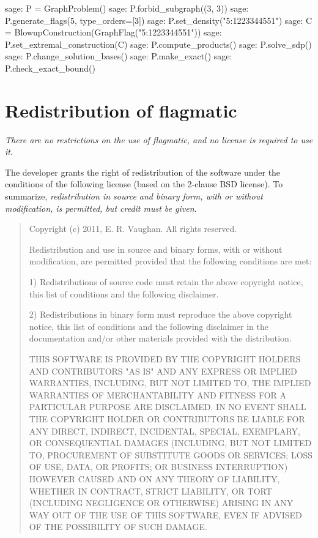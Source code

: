 \documentclass{article}
\begin{document}
\begin{sage}
sage: P = GraphProblem()
sage: P.forbid_subgraph((3, 3))
sage: P.generate_flags(5, type_orders=[3])
sage: P.set_density("5:1223344551")
sage: C = BlowupConstruction(GraphFlag("5:1223344551"))
sage: P.set_extremal_construction(C)
sage: P.compute_products()
sage: P.solve_sdp()
sage: P.change_solution_bases()
sage: P.make_exact()
sage: P.check_exact_bound()
\end{sage}

\section{Redistribution of flagmatic} \label{license}

\emph{There are no restrictions on the use of flagmatic, and no license is required to use it.}

The developer grants the right of redistribution of the software under the conditions of the following license (based on the 2-clause BSD license). To summarize, \emph{redistribution in source and binary form, with or without modification, is permitted, but credit must be given}.

\begin{quote}
Copyright (c) 2011, E. R. Vaughan. All rights reserved.

Redistribution and use in source and binary forms, with or without modification,
are permitted provided that the following conditions are met:

1) Redistributions of source code must retain the above copyright notice, this
list of conditions and the following disclaimer.

2) Redistributions in binary form must reproduce the above copyright notice,
this list of conditions and the following disclaimer in the documentation and/or
other materials provided with the distribution.

THIS SOFTWARE IS PROVIDED BY THE COPYRIGHT HOLDERS AND CONTRIBUTORS "AS IS" AND
ANY EXPRESS OR IMPLIED WARRANTIES, INCLUDING, BUT NOT LIMITED TO, THE IMPLIED
WARRANTIES OF MERCHANTABILITY AND FITNESS FOR A PARTICULAR PURPOSE ARE
DISCLAIMED. IN NO EVENT SHALL THE COPYRIGHT HOLDER OR CONTRIBUTORS BE LIABLE FOR
ANY DIRECT, INDIRECT, INCIDENTAL, SPECIAL, EXEMPLARY, OR CONSEQUENTIAL DAMAGES
(INCLUDING, BUT NOT LIMITED TO, PROCUREMENT OF SUBSTITUTE GOODS OR SERVICES;
LOSS OF USE, DATA, OR PROFITS; OR BUSINESS INTERRUPTION) HOWEVER CAUSED AND ON
ANY THEORY OF LIABILITY, WHETHER IN CONTRACT, STRICT LIABILITY, OR TORT
(INCLUDING NEGLIGENCE OR OTHERWISE) ARISING IN ANY WAY OUT OF THE USE OF THIS
SOFTWARE, EVEN IF ADVISED OF THE POSSIBILITY OF SUCH DAMAGE.
\end{quote}
\end{document}
